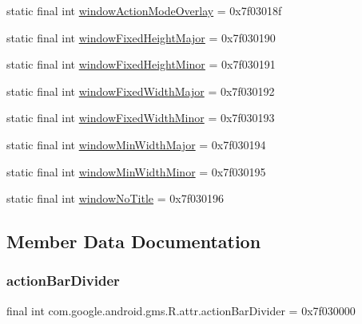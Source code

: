 \begin{DoxyCompactItemize}
\item 
static final int \mbox{\hyperlink{classcom_1_1google_1_1android_1_1gms_1_1R_1_1attr_af15a845ad348e6630655406f436952a5}{window\+Action\+Mode\+Overlay}} = 0x7f03018f
\item 
static final int \mbox{\hyperlink{classcom_1_1google_1_1android_1_1gms_1_1R_1_1attr_a28f8685b0f29167ebc48402db44893aa}{window\+Fixed\+Height\+Major}} = 0x7f030190
\item 
static final int \mbox{\hyperlink{classcom_1_1google_1_1android_1_1gms_1_1R_1_1attr_a642cb5741657f0fbf9d2c61de7a3a34c}{window\+Fixed\+Height\+Minor}} = 0x7f030191
\item 
static final int \mbox{\hyperlink{classcom_1_1google_1_1android_1_1gms_1_1R_1_1attr_aaa53a1a9bc30ced79bad631219ffdf37}{window\+Fixed\+Width\+Major}} = 0x7f030192
\item 
static final int \mbox{\hyperlink{classcom_1_1google_1_1android_1_1gms_1_1R_1_1attr_a70b0fbc903783e6ff330208546e9e1b4}{window\+Fixed\+Width\+Minor}} = 0x7f030193
\item 
static final int \mbox{\hyperlink{classcom_1_1google_1_1android_1_1gms_1_1R_1_1attr_aa834bcb104c95a9c131aa8d2a106020f}{window\+Min\+Width\+Major}} = 0x7f030194
\item 
static final int \mbox{\hyperlink{classcom_1_1google_1_1android_1_1gms_1_1R_1_1attr_a3efb0913804a74480968f6bbb075815e}{window\+Min\+Width\+Minor}} = 0x7f030195
\item 
static final int \mbox{\hyperlink{classcom_1_1google_1_1android_1_1gms_1_1R_1_1attr_a3c2b5f01cf93b7b49757227884e259b8}{window\+No\+Title}} = 0x7f030196
\end{DoxyCompactItemize}


\subsection{Member Data Documentation}
\mbox{\label{classcom_1_1google_1_1android_1_1gms_1_1R_1_1attr_a1430bf77f7f8d4cd6dabbf7e05515f68}} 
\subsubsection{\texorpdfstring{action\+Bar\+Divider}{actionBarDivider}}
{\footnotesize\ttfamily final int com.\+google.\+android.\+gms.\+R.\+attr.\+action\+Bar\+Divider = 0x7f030000\hspace{0.3cm}{\ttfamily [static]}}


